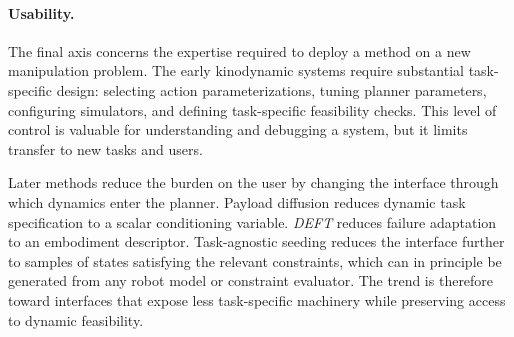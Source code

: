\paragraph{Usability.}
The final axis concerns the expertise required to deploy a method on a new manipulation problem.
The early kinodynamic systems require substantial task-specific design: selecting action parameterizations, tuning planner parameters, configuring simulators, and defining task-specific feasibility checks.
This level of control is valuable for understanding and debugging a system, but it limits transfer to new tasks and users.

Later methods reduce the burden on the user by changing the interface through which dynamics enter the planner.
Payload diffusion reduces dynamic task specification to a scalar conditioning variable.
\textit{DEFT} reduces failure adaptation to an embodiment descriptor.
Task-agnostic seeding reduces the interface further to samples of states satisfying the relevant constraints, which can in principle be generated from any robot model or constraint evaluator.
The trend is therefore toward interfaces that expose less task-specific machinery while preserving access to dynamic feasibility.








